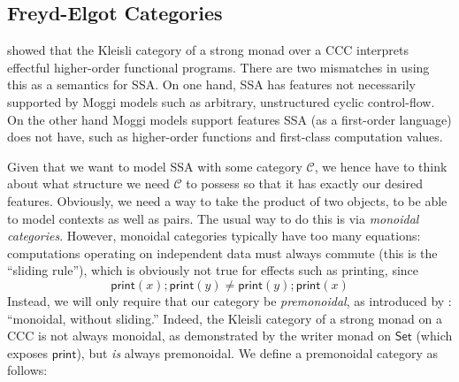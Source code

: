 \documentclass[acmsmall,screen,review]{acmart}
\newcommand{\mc}[1]{\ensuremath{\mathcal{#1}}}
\newcommand{\ms}[1]{\ensuremath{\mathsf{#1}}}
\begin{document}
\subsection{Freyd-Elgot Categories}

\citet{moggi-91-monad} showed that the Kleisli category of a strong monad over a CCC interprets
effectful higher-order functional programs. There are two mismatches in using this as a semantics
for SSA. 
%
On one hand, SSA has features not necessarily supported by Moggi models such as arbitrary,
unstructured cyclic control-flow. 
%
On the other hand Moggi models support features SSA (as a first-order language) does not have, such
as higher-order functions and first-class computation values.

Given that we want to model SSA with some category $\mc{C}$, we hence have to think about what
structure we need $\mc{C}$ to possess so that it has exactly our desired features. Obviously, we
need a way to take the product of two objects, to be able to model contexts as well as pairs.
% 
The usual way to do this is via \emph{monoidal categories}. 
%
However, monoidal categories typically have too many equations: 
%
computations operating on independent data must always commute (this is the ``sliding rule''), 
%
  which is obviously not true for effects such as printing, since
$$
\ms{print}(x) ; \ms{print}(y) \neq \ms{print}(y) ; \ms{print}(x)
$$
Instead, we will only require that our category be \emph{premonoidal}, as introduced by
\citet{power-97-premonoidal}: ``monoidal, without sliding.'' Indeed, the Kleisli category of a
strong monad on a CCC is not always monoidal, as demonstrated by the writer monad on $\ms{Set}$
(which exposes $\ms{print}$), but \emph{is} always premonoidal. We define a premonoidal category as
follows:
\end{document}
